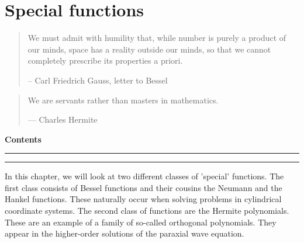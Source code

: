 \chapter{Special functions}
\label{h:special}

\begin{quote}
We must admit with humility that, while number is purely a product of our minds, space has a reality outside our minds, so that we cannot completely prescribe its properties a priori.

-- Carl Friedrich Gauss, letter to Bessel
\end{quote}

\begin{quote}
We are servants rather than masters in mathematics.

--- Charles Hermite
\end{quote}

{}
{\leavevmode\leftskip 0cm\relax}
{\bfseries\normalsize\makebox[1.cm][l]{\etocnumber}%
\etocname\nobreak\hfill\nobreak
\rlap{\makebox[0.5cm]{\etocpage\mdseries}}\par}
{}

{}
{\leavevmode\leftskip 0.2cm \rightskip 0.6cm  \relax}
{\makebox[1.cm][l]{\etocnumber}%
\etocname\nobreak\dotfill\nobreak
\rlap{\makebox[0.7cm][r]{\etocpage}}\par\vspace{-2mm}}
{}



\etocsettocstyle{}{}

\bigskip
\bfseries
\textcolor{headingbordeaux}{\large Contents}
\vspace{-5mm}

\rule{\textwidth}{0.4pt}
\vspace{-7mm}
\begin{small}
\localtableofcontents
\end{small}
\mdseries
\vspace{-3mm}
\rule{\textwidth}{0.4pt}
\smallskip

In this chapter, we will look at two different classes of 'special' functions. The first class consists of Bessel functions and their cousins the Neumann and the Hankel functions. These naturally occur when solving problems in cylindrical coordinate systems. The second class of functions are the Hermite polynomials. These are an example of a family of so-called orthogonal polynomials. They appear in the higher-order solutions of the paraxial wave equation.


